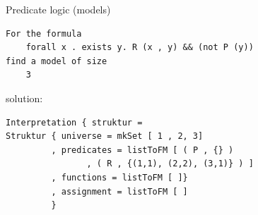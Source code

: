 \begin{slide}{Predicate logic (models)}
{\small
\begin{verbatim}
For the formula
    forall x . exists y. R (x , y) && (not P (y))
find a model of size
    3
\end{verbatim}

solution: \begin{verbatim} 
Interpretation { struktur = 
Struktur { universe = mkSet [ 1 , 2, 3]
         , predicates = listToFM [ ( P , {} ) 
                , ( R , {(1,1), (2,2), (3,1)} ) ]
         , functions = listToFM [ ]}
         , assignment = listToFM [ ] 
         } 
\end{verbatim}
}
\end{slide}
